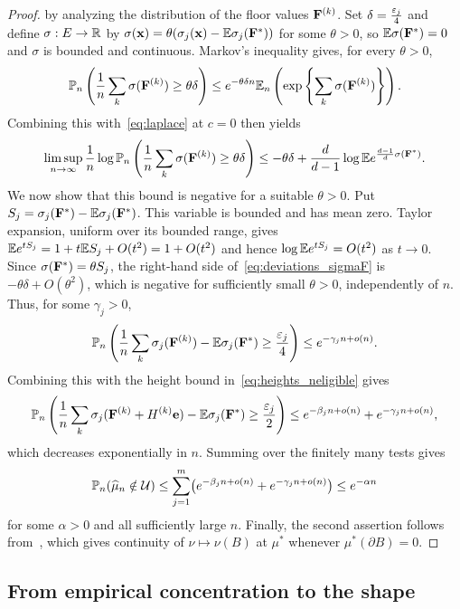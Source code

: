 \documentclass[11pt,letterpaper]{article}
\begin{document}
\begin{proof}
      by analyzing the distribution of the floor values $\mathbf F^{(k)}$. Set $\delta=\frac{\varepsilon_{j}}{4}$ and define $\sigma:E\to \mathbb R$ by $\sigma(\mathbf x)=\theta(\sigma_{j}(\mathbf x)-\mathbb E \sigma_{j}(\mathbf F^\ast))$ for some $\theta>0$, so $\mathbb E \sigma(\mathbf F^\ast)=0$ and $\sigma$ is bounded and continuous.
      Markov's inequality gives, for every $\theta>0$,
      \[
            \mathbb P_n \left(\frac1n\sum_k  \sigma(\mathbf F^{(k)})\geq\theta\delta\right)\le e^{-\theta\delta n} \mathbb E_n \left(\exp\left\{\sum_k \sigma(\mathbf F^{(k)})\right\}\right).
      \]
      Combining this with~\eqref{eq:laplace} at $c=0$ then yields
      \begin{equation}\label{eq:deviations_sigmaF}
            \limsup_{n\to\infty}\frac{1}{n}\log\mathbb P_n \left(\frac1n\sum_k \sigma(\mathbf F^{(k)})\geq\theta\delta\right)\le -\theta\delta+\frac d{d-1}\log\mathbb E e^{\frac{d-1}{d}\sigma(\mathbf F^\ast)}.
      \end{equation}
      We now show that this bound is negative for a suitable $\theta>0$. Put $S_j=\sigma_j(\mathbf F^\ast)-\mathbb E\sigma_j(\mathbf F^\ast)$. This variable is bounded and has mean zero. Taylor expansion, uniform over its bounded range, gives $\mathbb E e^{tS_j}=1+t\mathbb E S_j+O(t^2)=1+O(t^2)$ and hence $\log\mathbb E e^{tS_j}=O(t^2)$ as $t\to0$. Since $\sigma(\mathbf F^\ast)=\theta S_j$, the right-hand side of~\eqref{eq:deviations_sigmaF} is $-\theta\delta+O(\theta^2)$, which is negative for sufficiently small $\theta>0$, independently of $n$. Thus, for some $\gamma_j>0$,
      \[
            \mathbb P_n\left(\frac1n\sum_k\sigma_j(\mathbf F^{(k)})-\mathbb E\sigma_j(\mathbf F^\ast)\ge\frac{\varepsilon_j}{4}\right)\le e^{-\gamma_jn+o(n)}.
      \]
      Combining this with the height bound in~\eqref{eq:heights_neligible} gives
      \[\mathbb P_n\left(\frac{1}{n}\sum_{k} \sigma_{j}(\mathbf F^{(k)}+H^{(k)}\mathbf e)-\mathbb E \sigma_{j}(\mathbf F^\ast)\geq\frac{\varepsilon_{j}}{2}\right)\leq e^{-\beta_{j}n+o(n)}+e^{-\gamma_{j}n+o(n)},\]
      which decreases exponentially in $n$. Summing over the finitely many tests gives
      \[
            \mathbb P_n(\widehat\mu_n\notin\mathcal U) \le\sum_{j=1}^m \bigl(e^{-\beta_{j}n+o(n)}+e^{-\gamma_{j}n+o(n)}\bigr)\le e^{-\alpha n}
      \]
      for some $\alpha>0$ and all sufficiently large $n$. Finally, the second assertion follows from~\cite[Theorem~2.1]{Billingsley}, which gives continuity of $\nu\mapsto\nu(B)$ at $\mu^\ast$ whenever $\mu^\ast(\partial B)=0$.
\end{proof}

\subsection{From empirical concentration to the shape}
\end{document}
